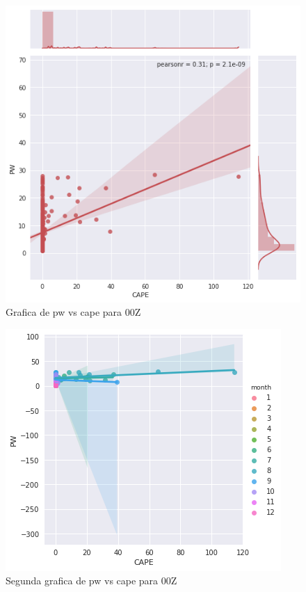 \documentclass{article}
\begin{document}
\begin{figure}[H]
\centering
\includegraphics[scale=0.59]{pvc00z.png}
\caption{Grafica de pw vs cape para 00Z}
\label{figure: pw vs cape para 00Z}
\end{figure}

\begin{figure}[H]
\centering
\includegraphics[scale=0.6]{pvc200z.png}
\caption{Segunda grafica de  pw vs cape para 00Z}
\label{figure: pw vs cape para 00Z}
\end{figure}
\end{document}

